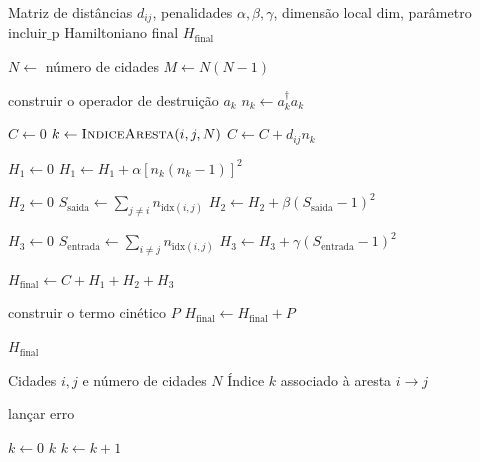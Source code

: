     \begin{algorithm}[htbp]
    \caption{Construção do Hamiltoniano qumode-binário para o TSP}
    \label{alg:hamiltoniano_qumode_binario}
    \begin{algorithmic}[1]
    \Require Matriz de distâncias $d_{ij}$, penalidades $\alpha,\beta,\gamma$, dimensão local $\mathrm{dim}$, parâmetro $\mathrm{incluir\_p}$
    \Ensure Hamiltoniano final $H_{\mathrm{final}}$

    \State $N \gets$ número de cidades
    \State $M \gets N(N-1)$ 

        \State construir o operador de destruição $a_k$
        \State $n_k \gets a_k^\dagger a_k$
    \EndFor

    \State $C \gets 0$
                \State $k \gets \Call{IndiceAresta}{i,j,N}$
                \State $C \gets C + d_{ij}n_k$
            \EndIf
        \EndFor
    \EndFor

    \State $H_1 \gets 0$
        \State $H_1 \gets H_1 + \alpha\left[n_k(n_k-1)\right]^2$
    \EndFor

    \State $H_2 \gets 0$
        \State $S_{\mathrm{saida}} \gets \sum_{j \neq i} n_{\mathrm{idx}(i,j)}$
        \State $H_2 \gets H_2 + \beta(S_{\mathrm{saida}}-1)^2$
    \EndFor

    \State $H_3 \gets 0$
        \State $S_{\mathrm{entrada}} \gets \sum_{i \neq j} n_{\mathrm{idx}(i,j)}$
        \State $H_3 \gets H_3 + \gamma(S_{\mathrm{entrada}}-1)^2$
    \EndFor

    \State $H_{\mathrm{final}} \gets C + H_1 + H_2 + H_3$

        \State construir o termo cinético $P$
        \State $H_{\mathrm{final}} \gets H_{\mathrm{final}} + P$
    \EndIf

    \State \Return $H_{\mathrm{final}}$
    \end{algorithmic}
    \end{algorithm}

    \begin{algorithm}[htbp]
    \caption{Mapeamento de uma aresta dirigida para o índice do qumode}
    \label{alg:indice_aresta}
    \begin{algorithmic}[1]
    \Require Cidades $i,j$ e número de cidades $N$
    \Ensure Índice $k$ associado à aresta $i \to j$

        \State lançar erro
    \EndIf

    \State $k \gets 0$
                    \State \Return $k$
                \EndIf
                \State $k \gets k+1$
            \EndIf
        \EndFor
    \EndFor
    \end{algorithmic}
    \end{algorithm}


